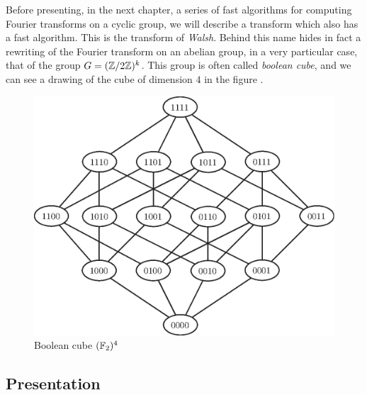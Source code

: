  Before presenting, in the next chapter, a series of fast algorithms for computing Fourier transforms on a cyclic group, we will describe a transform which also has a fast algorithm. This is the transform of \textit{Walsh}. Behind this name hides in fact a rewriting of the Fourier transform on an abelian group, in a very particular case, that of the group $ G = (\mathbb{Z}/2 \mathbb{Z})^k $. This group is often called \textit{boolean cube}, and we can see a drawing of the cube of dimension $ 4 $ in the figure . \begin{figure}[ht]
    \begin{center}
    \includegraphics [scale = 0.6]{images/cube-booleen.eps}
    \end{center}
    \caption{Boolean cube $ (\mathbb{F}_2)^4 $}
              \label{fig-cube-booleen}
\end{figure}
 
\subsection{Presentation}
\label{sect2-presentation-transforme-walsh} 
 
